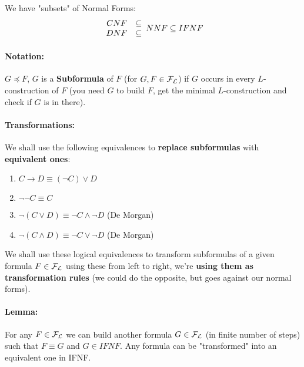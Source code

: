 	We have "subsets" of Normal Forms:
	$$
	\begin{array}{c c}
		CNF & \subseteq \\
		DNF & \subseteq
	\end{array}
	NNF \subseteq IFNF
	$$

	\newpage


	\paragraph{Notation:} $G \preceq F$, $G$ is a \textbf{Subformula} of $F$ (for $G,F \in \mathcal{F}_\mathcal{L}$) if $G$ occurs in every $L$-construction of $F$ (you need $G$ to build $F$, get the minimal $L$-construction and check if $G$ is in there).\\

	\paragraph{Transformations:} We shall use the following equivalences to \textbf{replace subformulas} with \textbf{equivalent ones}:
	\begin{enumerate}
		\item $C \rightarrow D \equiv (\neg C) \vee D$
		\item $\neg \neg C \equiv C$
		\item $\neg (C \vee D) \equiv \neg C \wedge \neg D$ (De Morgan)
		\item $\neg (C \wedge D) \equiv \neg C \vee \neg D$ (De Morgan)
	\end{enumerate}

	We shall use these logical equivalences to transform subformulas of a given formula $F \in \mathcal{F}_\mathcal{L}$ using these from left to right, we're \textbf{using them as transformation rules} (we could do the opposite, but goes against our normal forms).\\

	\paragraph{Lemma:} For any $F \in \mathcal{F}_\mathcal{L}$ we can build another formula $G \in \mathcal{F}_\mathcal{L}$ (in finite number of steps) such that $F \equiv G$ and $G \in IFNF$. Any formula can be "transformed" into an equivalent one in IFNF.\\

